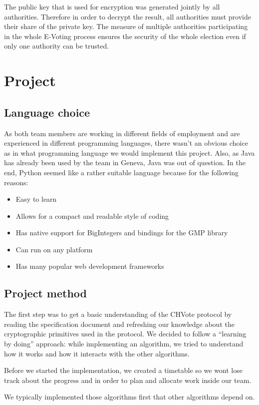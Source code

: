 \documentclass[a4paper,12pt]{report}
\begin{document}
The public key that is used for encryption was generated jointly by all authorities. Therefore in order to decrypt the result, all authorities must provide their share of the private key. The measure of multiple authorities participating in the whole E-Voting process ensures the security of the whole election even if only one authority can be trusted.

\chapter{Project}
\section{Language choice}
As both team members are working in different fields of employment and are experienced in different programming languages, there wasn't an obvious choice as in what programming language we would implement this project. Also, as Java has already been used by the team in Geneva, Java was out of question. In the end, Python seemed like a rather suitable language because for the following reasons:

\begin{itemize}
	\item Easy to learn
	\item Allows for a compact and readable style of coding
	\item Has native support for BigIntegers and bindings for the GMP library
	\item Can run on any platform
	\item Has many popular web development frameworks
\end{itemize}

\section{Project method}
The first step was to get a basic understanding of the CHVote protocol by reading the specification document and refreshing our knowledge about the cryptographic primitives used in the protocol. We decided to follow a "`learning by doing"' approach: while implementing an algorithm, we tried to understand how it works and how it interacts with the other algorithms.

Before we started the implementation, we created a timetable so we wont lose track about the progress and in order to plan and allocate work inside our team.

We typically implemented those algorithms first that other algorithms depend on.
\end{document}
